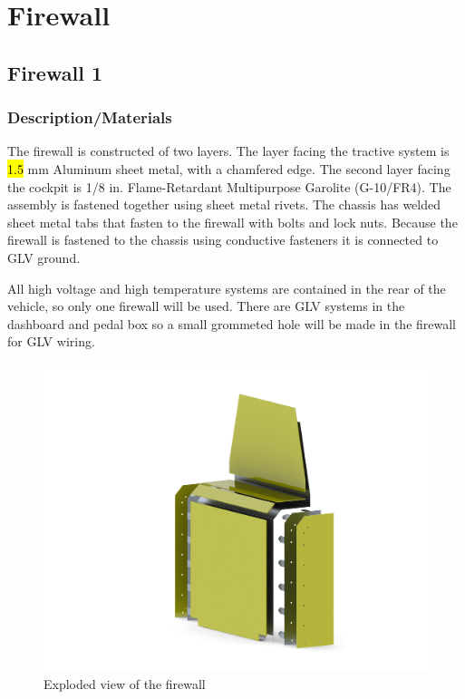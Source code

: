\documentclass{article}
\DeclareRobustCommand{\hlr}[1]{{\sethlcolor{red}\hl{#1}}}
\begin{document}
\newpage

\section{Firewall}

    \subsection{Firewall 1}

        \subsubsection{Description/Materials}

            The firewall is constructed of two layers. The layer facing the tractive system is \hlr{1.5} mm Aluminum sheet metal, with a chamfered edge. The second layer facing the cockpit is 1/8 in. Flame-Retardant Multipurpose Garolite (G-10/FR4). The assembly is fastened together using sheet metal rivets. The chassis has welded sheet metal tabs that fasten to the firewall with bolts and lock nuts. Because the firewall is fastened to the chassis using conductive fasteners it is connected to GLV ground.

            All high voltage and high temperature systems are contained in the rear of the vehicle, so only one firewall will be used. There are GLV systems in the dashboard and pedal box so a small grommeted hole will be made in the firewall for GLV wiring.

            \begin{figure}[H]
                \centering
                \includegraphics[width = 0.6 \textwidth]{ExplodedView}
                \caption{Exploded view of the firewall}
                \label{explodedfirewall}
            \end{figure}
\end{document}
